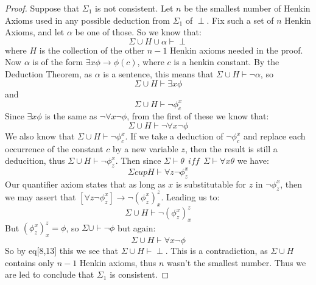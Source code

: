 \documentclass[9pt,a4paper, twocolumn]{article}
\begin{document}
        \begin{proof}
            Suppose that $\Sigma_1$ is not consistent. Let $n$ be the smallest number of Henkin Axioms used in any possible deduction from $\Sigma_1$ of $\perp$. Fix such a set of $n$ Henkin Axioms, and let $\alpha$ be one of those. So we know that:
            \begin{equation}
                \Sigma\cup H\cup\alpha \vdash \perp
            \end{equation}
            where $H$ is the collection of the other $n-1$ Henkin axioms needed in the proof. Now $\alpha$ is of the form $\exists x \phi \rightarrow \phi(c)$, where $c$ is a henkin constant. By the Deduction Theorem, as $\alpha$ is a sentence, this means that $\Sigma \cup H\vdash \neg \alpha $, so 
            \begin{equation}
                \Sigma\cup H\vdash \exists x\phi 
            \end{equation}
            and
            \begin{equation}
                \Sigma\cup H\vdash \neg\phi_c^x 
            \end{equation}
            Since $\exists x \phi$ is the same as $\neg\forall x \neg\phi$, from the first of these we know that:
            \begin{equation}
                \Sigma \cup H \vdash \neg\forall x \neg\phi
            \end{equation}
            We also know that $\Sigma \cup H\vdash \neg\phi_c^x$. If we take a deduction of $\neg\phi_c^x$ and replace each occurrence of the constant $c$ by a new variable $z$, then the result is still a deducition, thus $\Sigma \cup H\vdash \neg \phi_z^x$. Then since $\Sigma \vdash \theta \ \ iff  \ \ \Sigma\vdash \forall x\theta$ we have:
            \begin{equation}
                \Sigma cup H \vdash \forall z\neg\phi_z^x 
            \end{equation}
            Our quantifier axiom states that as long as $x$ is substitutable for $z$ in $\neg\phi_z^x$, then we may assert that $\left[\forall z\neg\phi_z^x \right]\rightarrow \neg(\phi_z^x)_x^z$. Leading us to:
            \begin{equation}
                \Sigma \cup H\vdash \neg(\phi_z^x)_x^z 
            \end{equation}
            But $(\phi_z^x)_x^z = \phi$, so $\Sigma \cup \vdash \neg\phi$ but again:
            \begin{equation}
                \Sigma\cup H \vdash \forall x \neg\phi 
            \end{equation}
            So by eq[8,13] this we see that $\Sigma\cup H \vdash \perp$. This is a contradiction, as $\Sigma\cup H$ contains only $n-1$ Henkin axioms, thus $n$ wasn't the smallest number. Thus we are led to conclude that $\Sigma_1$ is consistent.
        \end{proof}
\end{document}
